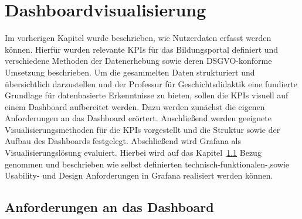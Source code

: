 \chapter{Dashboardvisualisierung} %
\label{ch:auswahl}
Im vorherigen Kapitel wurde beschrieben, wie Nutzerdaten erfasst werden können. Hierfür wurden relevante KPIs für das Bildungsportal definiert und verschiedene Methoden der Datenerhebung sowie deren DSGVO-konforme Umsetzung beschrieben. Um die gesammelten Daten strukturiert und übersichtlich darzustellen und der Professur für Geschichtsdidaktik eine fundierte Grundlage für datenbasierte Erkenntnisse zu bieten, sollen die KPIs visuell auf einem Dashboard aufbereitet werden. Dazu werden zunächst die eigenen Anforderungen an das Dashboard erörtert. Anschließend werden geeignete Visualisierungsmethoden für die KPIs vorgestellt und die Struktur sowie der Aufbau des Dashboards festgelegt. Abschließend wird Grafana als Visualisierungslösung evaluiert. Hierbei wird auf das Kapitel~\ref{sec:anforderungen} Bezug genommen und beschrieben wie selbst definierten technisch-funktionalen-,sowie Usability- und Design Anforderungen in Grafana realisiert werden können. 

\section{Anforderungen an das Dashboard}
\label{sec:anforderungen}
